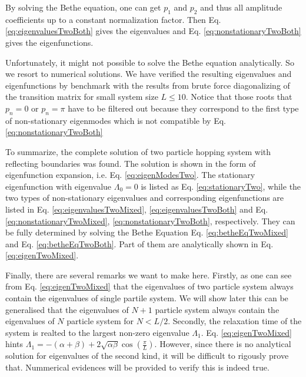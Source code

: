 By solving the Bethe equation, one can get $p_1$ and $p_2$ and thus all amplitude coefficients up to a constant normalization factor. Then Eq.  \eqref{eq:eigenvaluesTwoBoth} gives the eigenvalues and Eq.  \eqref{eq:nonstationaryTwoBoth} gives the eigenfunctions.

Unfortunately, it might not possible to solve the Bethe equation analytically.  So we resort to numerical solutions. We have verified the resulting eigenvalues and eigenfunctions by benchmark with the results from brute force diagonalizing of the transition matrix for small system size $L\le10$. Notice that those roots that $p_n=0$ or $p_n=\pi$ have to be filtered out because they correspond to the first type of non-stationary eigenmodes which is not compatible by Eq. \eqref{eq:nonstationaryTwoBoth}


To summarize, the complete solution of two particle hopping system with reflecting boundaries was found. The solution is shown in the form of eigenfunction expansion, i.e. Eq. \eqref{eq:eigenModesTwo}. The stationary eigenfunction with eigenvalue $\Lambda_0=0$ is listed as Eq.  \eqref{eq:stationaryTwo}, while the two types of non-stationary eigenvalues and corresponding eigenfunctions are listed in Eq. \eqref{eq:eigenvaluesTwoMixed}, \eqref{eq:eigenvaluesTwoBoth} and Eq.  \eqref{eq:nonstationaryTwoMixed}, \eqref{eq:nonstationaryTwoBoth}, respectively. They can be fully determined by  solving the Bethe Equation Eq. \eqref{eq:betheEqTwoMixed} and Eq. \eqref{eq:betheEqTwoBoth}. Part of them are analytically shown in Eq. \eqref{eq:eigenTwoMixed}.

Finally, there are several remarks we want to make here.  Firstly, as one can see from Eq.  \eqref{eq:eigenTwoMixed} that the eigenvalues of two particle system always contain the eigenvalues of single partile system. We will show later this can be generalised that the eigenvalues of $N+1$ particle system always contain the eigenvalues of $N$ particle system for $N<L/2$. Secondly, the relaxation time of the system is realted to the largest non-zero eigenvalue $\Lambda_1$. Eq.  \eqref{eq:eigenTwoMixed} hints $\Lambda_1=-(\alpha+\beta)+2\sqrt{\alpha\beta} \cos\left(\frac{\pi}{L}\right)$.  However, since there is no analytical solution for eigenvalues of the second kind, it will be difficult to rigously prove that. Nummerical evidences will be provided to verify this is indeed true.

